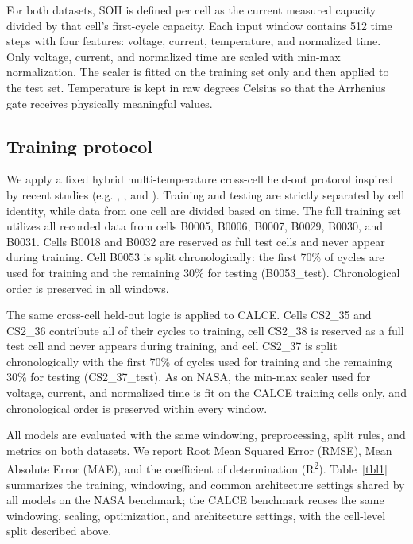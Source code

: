\documentclass[a4paper,fleqn]{cas-sc}
\begin{document}
For both datasets, SOH is defined per cell as the current measured capacity divided by that cell's first-cycle capacity. Each input window contains 512 time steps with four features: voltage, current, temperature, and normalized time. Only voltage, current, and normalized time are scaled with min-max normalization. The scaler is fitted on the training set only and then applied to the test set. Temperature is kept in raw degrees Celsius so that the Arrhenius gate receives physically meaningful values.

\subsection{Training protocol}\label{sec:training}
We apply a fixed hybrid multi-temperature cross-cell held-out protocol inspired by recent studies (e.g. \citep{sahoo2022transfer}, \citep{che2023increasing}, and \citep{kumar2026temperature}).
Training and testing are strictly separated by cell identity, while data from one cell are divided based on time.
The full training set utilizes all recorded data from cells B0005, B0006, B0007, B0029, B0030, and B0031. Cells B0018 and B0032 are reserved as full test cells and never appear during training. Cell B0053 is split chronologically: the first 70\% of cycles are used for training and the remaining 30\% for testing (B0053\_test). Chronological order is preserved in all windows.

The same cross-cell held-out logic is applied to CALCE. Cells CS2\_35 and CS2\_36 contribute all of their cycles to training, cell CS2\_38 is reserved as a full test cell and never appears during training, and cell CS2\_37 is split chronologically with the first 70\% of cycles used for training and the remaining 30\% for testing (CS2\_37\_test). As on NASA, the min-max scaler used for voltage, current, and normalized time is fit on the CALCE training cells only, and chronological order is preserved within every window.

All models are evaluated with the same windowing, preprocessing, split rules, and metrics on both datasets. We report Root Mean Squared Error (RMSE), Mean Absolute Error (MAE), and the coefficient of determination (R\textsuperscript{2}). Table~\ref{tbl1} summarizes the training, windowing, and common architecture settings shared by all models on the NASA benchmark; the CALCE benchmark reuses the same windowing, scaling, optimization, and architecture settings, with the cell-level split described above.
\end{document}
